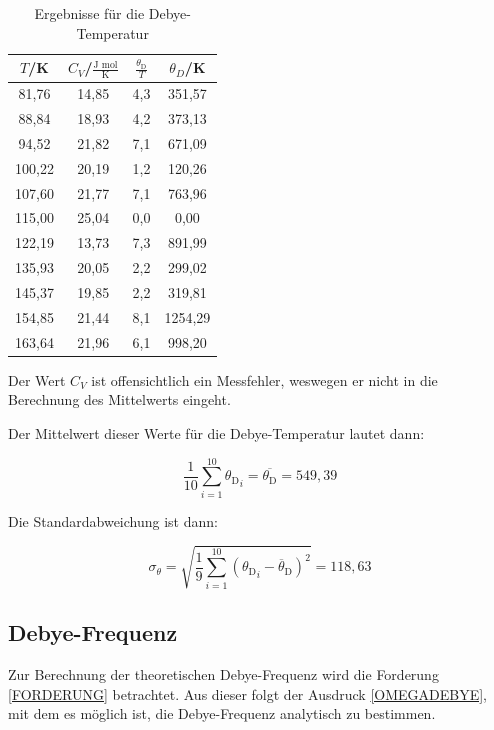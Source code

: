 \begin{table}[H]
	\begin{center}
		\begin{tabular}{c c c c}
			\toprule
			\(T\)/K & \(C_V\)/\(\frac{\text{J mol}}{\text{K}}\) & \(\frac{\theta_\text{D}}{T}\) & \(\theta_D\)/K \\
			\midrule
			81,76	&14,85	&4,3		&351,57\\
			88,84	&18,93	&4,2		&373,13\\
			94,52	&21,82	&7,1		&671,09\\
			100,22	&20,19	&1,2		&120,26\\
			107,60	&21,77	&7,1		&763,96\\
			115,00	&25,04	&0,0		&0,00\\
			122,19	&13,73	&7,3		&891,99\\
			135,93	&20,05	&2,2		&299,02\\
			145,37	&19,85	&2,2		&319,81\\
			154,85	&21,44	&8,1		&1254,29\\
			163,64	&21,96	&6,1		&998,20\\
			\bottomrule
		\end{tabular}
		\caption{Ergebnisse für die Debye-Temperatur}
		\label{fig:tab5}
	\end{center}
\end{table}

\noindent Der Wert \(C_V\) ist offensichtlich ein Messfehler, weswegen er nicht in die Berechnung des Mittelwerts eingeht.

\noindent Der Mittelwert dieser Werte für die Debye-Temperatur lautet dann:

\begin{equation}
\frac{1}{10}\sum\limits_{i=1}^{10}{\theta_{\text{D}}}_i=\overline{\theta_\text{D}}=549,39
\end{equation}

\noindent Die Standardabweichung ist dann:

\begin{equation}
\sigma_\theta=\sqrt{\frac{1}{9}\sum\limits_{i=1}^{10}({\theta_{\text{D}}}_i-\overline \theta_{\text{D}})^2}=118,63
\end{equation}

\subsection{Debye-Frequenz}
Zur Berechnung der theoretischen Debye-Frequenz wird die Forderung \ref{FORDERUNG} betrachtet. Aus dieser folgt der Ausdruck \ref{OMEGADEBYE}, mit dem es möglich ist, die Debye-Frequenz analytisch zu bestimmen.

